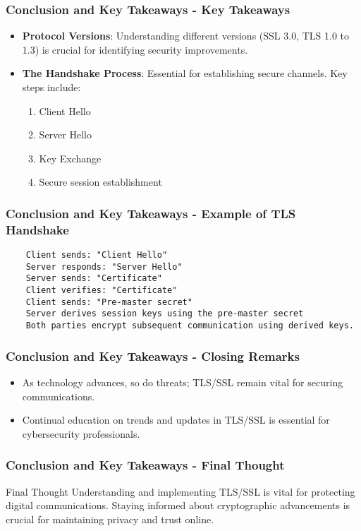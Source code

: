 \documentclass{beamer}
\begin{document}
\begin{frame}[fragile]
    \frametitle{Conclusion and Key Takeaways - Key Takeaways}
    \begin{itemize}
        \item \textbf{Protocol Versions}: Understanding different versions (SSL 3.0, TLS 1.0 to 1.3) is crucial for identifying security improvements.
        \item \textbf{The Handshake Process}: Essential for establishing secure channels. Key steps include:
        \begin{enumerate}
            \item Client Hello
            \item Server Hello
            \item Key Exchange
            \item Secure session establishment
        \end{enumerate}
    \end{itemize}
\end{frame}

\begin{frame}[fragile]
    \frametitle{Conclusion and Key Takeaways - Example of TLS Handshake}
    \begin{lstlisting}
    Client sends: "Client Hello"
    Server responds: "Server Hello"
    Server sends: "Certificate"
    Client verifies: "Certificate"
    Client sends: "Pre-master secret"
    Server derives session keys using the pre-master secret
    Both parties encrypt subsequent communication using derived keys.
    \end{lstlisting}
\end{frame}

\begin{frame}[fragile]
    \frametitle{Conclusion and Key Takeaways - Closing Remarks}
    \begin{itemize}
        \item As technology advances, so do threats; TLS/SSL remain vital for securing communications.
        \item Continual education on trends and updates in TLS/SSL is essential for cybersecurity professionals.
    \end{itemize}
\end{frame}

\begin{frame}[fragile]
    \frametitle{Conclusion and Key Takeaways - Final Thought}
    \begin{block}{Final Thought}
        Understanding and implementing TLS/SSL is vital for protecting digital communications. 
        Staying informed about cryptographic advancements is crucial for maintaining privacy and trust online.
    \end{block}
\end{frame}
\end{document}
